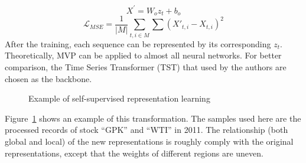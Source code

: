 \begin{equation} 
    X^\prime = W_o z_t + b_o 
\end{equation}
\begin{equation} 
    \mathcal{L}_{MSE} = \frac{1}{|M|} \sum_{t,i \in M} \sum (X\prime_{t,i} - X_{t,i}) ^ 2
\end{equation}
After the training, each sequence can be represented by its corresponding $z_t$. Theoretically, MVP can be applied to almost all neural networks. For better comparison, the Time Series Transformer (TST) that used by the authors are chosen as the backbone. 
\begin{figure}[!htbp]
    \centering 
    \caption{Example of self-supervised representation learning} 
    \label{fig:gpkwti1} 
\end{figure} 
Figure~\ref{fig:gpkwti1} shows an example of this transformation. The samples used here are the processed records of stock ``GPK'' and ``WTI'' in 2011. The relationship (both global and local) of the new representations is roughly comply with the original representations, except that the weights of different regions are uneven. 

